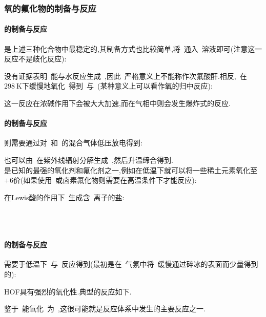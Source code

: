 \documentclass{ctexbook}
\begin{document}
\subsubsection{氧的氟化物的制备与反应}
\paragraph{的制备与反应}
是上述三种化合物中最稳定的,其制备方式也比较简单,将~通入~溶液即可(注意这一反应不是歧化反应):
\begin{tightcenter}
\end{tightcenter}
没有证据表明~能与水反应生成~,因此~严格意义上不能称作次氟酸酐.相反,~在$\SI{298}{\kelvin}$下缓慢地氧化~得到~与~(某种意义上可以看作氧的归中反应):
\begin{tightcenter}
\end{tightcenter}
这一反应在浓碱作用下会被大大加速,而在气相中则会发生爆炸式的反应.
\paragraph{的制备与反应}
则需要通过对~和~的混合气体低压放电得到:
\begin{tightcenter}
\end{tightcenter}
也可以由~在紫外线辐射分解生成~,然后升温缔合得到.\\
\indent {}是已知的最强的氧化剂和氟化剂之一,例如在低温下就可以将一些稀土元素氧化至$+6$价(如果使用~或卤素氟化物则需要在高温条件下才能反应):
\begin{tightcenter}
\end{tightcenter}
在Lewis酸的作用下~生成含~离子的盐:
\begin{tightcenter}
    \\
    \\
\end{tightcenter}
\paragraph{的制备与反应}
需要于低温下~与~反应得到(最初是在~气氛中将~缓慢通过碎冰的表面而少量得到的\cite{Studier1971}):
\begin{tightcenter}
\end{tightcenter}
HOF具有强烈的氧化性.典型的反应如下.
\begin{tightcenter}
\end{tightcenter}
鉴于~能氧化~为~,这很可能就是反应体系中发生的主要反应之一.
\end{document}

